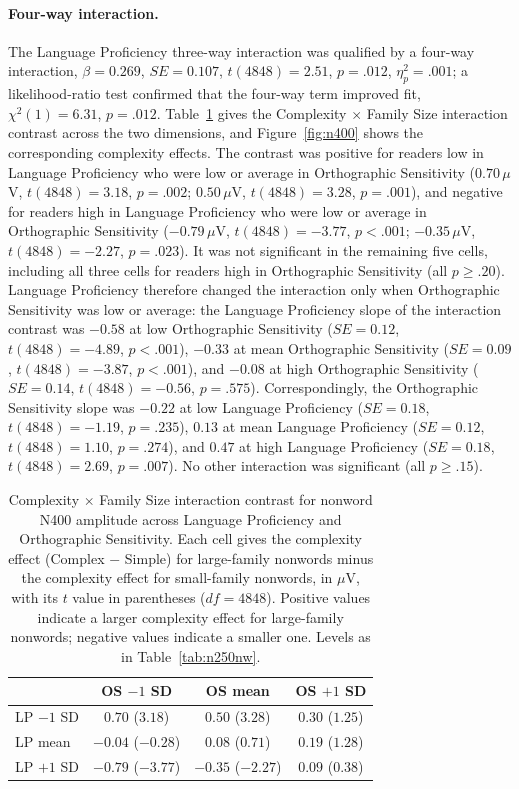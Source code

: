 \documentclass[utf8]{FrontiersinHarvard} %
\begin{document}
\paragraph*{Four-way interaction.} The Language Proficiency three-way interaction was qualified by a four-way interaction, $\beta = 0.269$, $SE = 0.107$, $t(4848) = 2.51$, $p = .012$, $\eta^2_p = .001$; a likelihood-ratio test confirmed that the four-way term improved fit, $\chi^2(1) = 6.31$, $p = .012$. Table~\ref{tab:n400nw} gives the Complexity $\times$ Family Size interaction contrast across the two dimensions, and Figure~\ref{fig:n400} shows the corresponding complexity effects. The contrast was positive for readers low in Language Proficiency who were low or average in Orthographic Sensitivity ($0.70\,\mu$V, $t(4848) = 3.18$, $p = .002$; $0.50\,\mu$V, $t(4848) = 3.28$, $p = .001$), and negative for readers high in Language Proficiency who were low or average in Orthographic Sensitivity ($-0.79\,\mu$V, $t(4848) = -3.77$, $p < .001$; $-0.35\,\mu$V, $t(4848) = -2.27$, $p = .023$). It was not significant in the remaining five cells, including all three cells for readers high in Orthographic Sensitivity (all $p \geq .20$). Language Proficiency therefore changed the interaction only when Orthographic Sensitivity was low or average: the Language Proficiency slope of the interaction contrast was $-0.58$ at low Orthographic Sensitivity ($SE = 0.12$, $t(4848) = -4.89$, $p < .001$), $-0.33$ at mean Orthographic Sensitivity ($SE = 0.09$, $t(4848) = -3.87$, $p < .001$), and $-0.08$ at high Orthographic Sensitivity ($SE = 0.14$, $t(4848) = -0.56$, $p = .575$). Correspondingly, the Orthographic Sensitivity slope was $-0.22$ at low Language Proficiency ($SE = 0.18$, $t(4848) = -1.19$, $p = .235$), $0.13$ at mean Language Proficiency ($SE = 0.12$, $t(4848) = 1.10$, $p = .274$), and $0.47$ at high Language Proficiency ($SE = 0.18$, $t(4848) = 2.69$, $p = .007$). No other interaction was significant (all $p \geq .15$).

\begin{table}[htbp]
	\centering
	\small
	\caption{Complexity $\times$ Family Size interaction contrast for nonword N400 amplitude across Language Proficiency and Orthographic Sensitivity. Each cell gives the complexity effect (Complex $-$ Simple) for large-family nonwords minus the complexity effect for small-family nonwords, in $\mu$V, with its $t$ value in parentheses ($df = 4848$). Positive values indicate a larger complexity effect for large-family nonwords; negative values indicate a smaller one. Levels as in Table~\ref{tab:n250nw}.}
	\label{tab:n400nw}
	\begin{tabular}{lccc}
		\toprule
		& OS $-1$ SD & OS mean & OS $+1$ SD \\
		\midrule
		LP $-1$ SD & $0.70$ ($3.18$) & $0.50$ ($3.28$) & $0.30$ ($1.25$) \\
		LP mean & $-0.04$ ($-0.28$) & $0.08$ ($0.71$) & $0.19$ ($1.28$) \\
		LP $+1$ SD & $-0.79$ ($-3.77$) & $-0.35$ ($-2.27$) & $0.09$ ($0.38$) \\
		\bottomrule
	\end{tabular}
\end{table}
\end{document}
